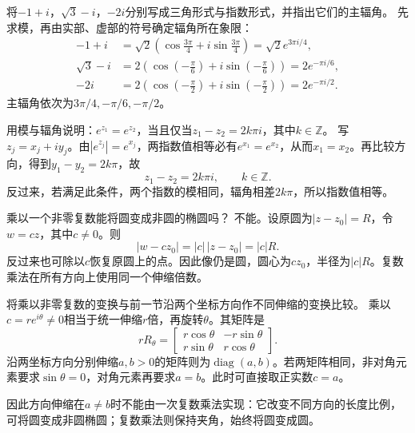 将\(- 1 + i\)，\(\sqrt{3} - i\)，\(- 2 i\)分别写成三角形式与指数形式，并指出它们的主辐角。
\solutionanswer
先求模，再由实部、虚部的符号确定辐角所在象限：
\[
\begin{aligned}
-1+i&=\sqrt2\left(\cos\frac{3\pi}4+i\sin\frac{3\pi}4\right)
=\sqrt2e^{3\pi i/4},\\
\sqrt3-i&=2\left(\cos\left(-\frac\pi6\right)+i\sin\left(-\frac\pi6\right)\right)
=2e^{-\pi i/6},\\
-2i&=2\left(\cos\left(-\frac\pi2\right)+i\sin\left(-\frac\pi2\right)\right)
=2e^{-\pi i/2}.
\end{aligned}
\]
主辐角依次为\(3\pi/4,-\pi/6,-\pi/2\)。


用模与辐角说明：\(e^{z_{1}} = e^{z_{2}}\)，当且仅当\(z_{1} - z_{2} = 2 k \pi i\)，其中\(k \in \mathbb{Z}\)。
\solutionanswer
写\(z_j=x_j+iy_j\)。由\(|e^{z_j}|=e^{x_j}\)，两指数值相等必有\(e^{x_1}=e^{x_2}\)，从而\(x_1=x_2\)。再比较方向，得到\(y_1-y_2=2k\pi\)，故
\[
z_1-z_2=2k\pi i,\qquad k\in\mathbb Z.
\]
反过来，若满足此条件，两个指数的模相同，辐角相差\(2k\pi\)，所以指数值相等。


乘以一个非零复数能将圆变成非圆的椭圆吗？
\solutionanswer
不能。设原圆为\(|z-z_0|=R\)，令\(w=cz\)，其中\(c\ne0\)。则
\[
|w-cz_0|=|c|\,|z-z_0|=|c|R.
\]
反过来也可除以\(c\)恢复原圆上的点。因此像仍是圆，圆心为\(cz_0\)，半径为\(|c|R\)。复数乘法在所有方向上使用同一个伸缩倍数。


将乘以非零复数的变换与前一节沿两个坐标方向作不同伸缩的变换比较。
\solutionanswer
乘以\(c=re^{i\theta}\ne0\)相当于统一伸缩\(r\)倍，再旋转\(\theta\)。其矩阵是
\[
rR_\theta=\begin{bmatrix}r\cos\theta&-r\sin\theta\\
r\sin\theta&r\cos\theta\end{bmatrix}.
\]
沿两坐标方向分别伸缩\(a,b>0\)的矩阵则为\(\operatorname{diag}(a,b)\)。若两矩阵相同，非对角元素要求\(\sin\theta=0\)，对角元素再要求\(a=b\)。此时可直接取正实数\(c=a\)。

因此方向伸缩在\(a\ne b\)时不能由一次复数乘法实现：它改变不同方向的长度比例，可将圆变成非圆椭圆；复数乘法则保持夹角，始终将圆变成圆。


